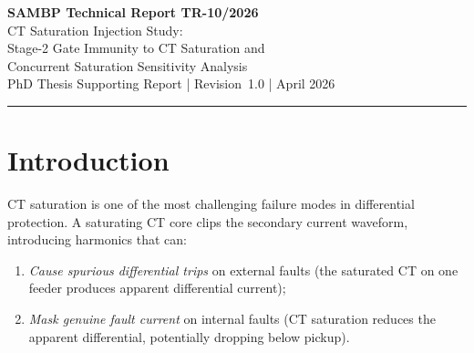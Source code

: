 \documentclass[12pt,a4paper]{article}
\newcommand{\SAMBP}{\textsc{sambp}}
\newcommand{\epsct}{\varepsilon_{\rm CT}}
\begin{document}
\begin{center}
  {\LARGE\bfseries\color{sambpblue}
    SAMBP Technical Report TR-10/2026}\\[6pt]
  {\large CT Saturation Injection Study:\\
    Stage-2 Gate Immunity to CT Saturation and\\
    Concurrent Saturation Sensitivity Analysis}\\[10pt]
  {\normalsize PhD Thesis Supporting Report \quad|\quad
    Revision~1.0 \quad| April 2026}
\end{center}

\vspace{4pt}\hrule\vspace{8pt}

\begin{abstract}
\noindent
This report extends the Monte Carlo framework of TR-08/TR-09~\citep{SAMBP_TR09}
to test the \SAMBP{} Stage-2 confidence gate against CT saturation events.
A bipolar square-wave CT saturation model is injected at seven $\epsct$
levels from 0 to 0.25~pu into two complementary test families: (A)~external
fault scenarios where CT saturation creates a spurious differential, and
(B)~internal fault scenarios where concurrent CT saturation of the
fault-current CT degrades the differential waveform quality.  The study
reveals a fundamental tension in the gate design: $\epsct$-based vetoing
correctly suppresses Family~A spurious trips but incorrectly suppresses
Family~B legitimate trips at $\epsct \geq 0.05$.  A magnitude-override
rule is derived — when the estimated differential fundamental
$\hat{I}_{\rm diff,fund} \geq 0.60$~pu, the veto is suppressed regardless
of $\epsct$.  With this addition the gate achieves External~FPR~=~0.000
and Internal~TPR~=~1.000 across all $\epsct \in [0, 0.25]$ and all four
protected zones.
\end{abstract}

\tableofcontents
\listoffigures
\listoftables
\newpage

\section{Introduction}

CT saturation is one of the most challenging failure modes in differential
protection.  A saturating CT core clips the secondary current waveform,
introducing harmonics that can:
\begin{enumerate}[noitemsep]
  \item \emph{Cause spurious differential trips} on external faults (the
    saturated CT on one feeder produces apparent differential current);
  \item \emph{Mask genuine fault current} on internal faults (CT saturation
    reduces the apparent differential, potentially dropping below pickup).
\end{enumerate}
\end{document}
